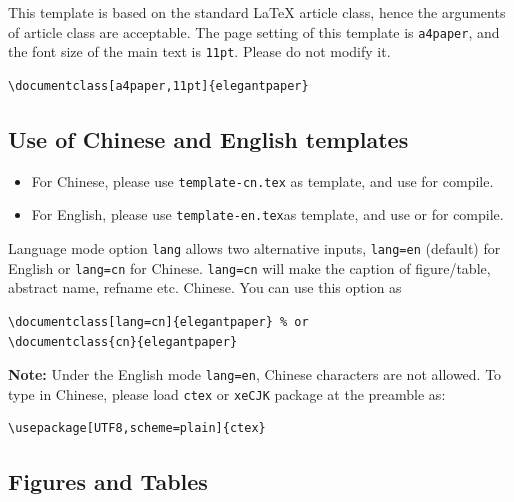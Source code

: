 \documentclass[11pt,en]{elegantpaper}
\begin{document}
This template is based on the standard \LaTeX{} article class, hence the arguments of article class are acceptable. The page setting of this template is \lstinline {a4paper}, and the font size of the main text is \lstinline {11pt}. Please do not modify it.

\begin{lstlisting}
\documentclass[a4paper,11pt]{elegantpaper}
\end{lstlisting}

\subsection{Use of Chinese and English templates}

\begin{itemize}
    \item For Chinese, please use \lstinline{template-cn.tex} as template, and use  for compile.
    \item For English, please use \lstinline{template-en.tex}as template, and use  or  for compile.
\end{itemize}

Language mode option \lstinline{lang} allows two alternative inputs, \lstinline{lang=en} (default)  for English or \lstinline{lang=cn} for Chinese. \lstinline{lang=cn} will make the caption of figure/table, abstract name, refname etc. Chinese. You can use this option as
\begin{lstlisting}
\documentclass[lang=cn]{elegantpaper} % or
\documentclass{cn}{elegantpaper} 
\end{lstlisting}
\textbf{Note:} Under the English mode \lstinline{lang=en}, Chinese characters are not allowed. To type in Chinese, please load  \lstinline{ctex} or \lstinline{xeCJK} package at the preamble as:
\begin{lstlisting}
\usepackage[UTF8,scheme=plain]{ctex}
\end{lstlisting}

\subsection{Figures and Tables}
\end{document}
